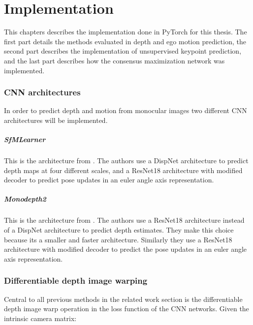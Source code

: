 \chapter{Implementation}\label{cha:implementation}

This chapters describes the implementation done in PyTorch for this thesis. The first part details the methods evaluated in depth and ego motion prediction, the second part describes the implementation of unsupervised keypoint prediction, and the last part describes how the consensus maximization network was implemented.







\iffalse

\subsection{CNN architectures}

In order to predict depth and motion from monocular images two different CNN architectures will be implemented.

\paragraph{SfMLearner} This is the architecture from \cite{sfmlearner}. The authors use a DispNet\cite{dispnet} architecture to predict depth maps at four different scales, and a ResNet18\cite{resnet} architecture with modified decoder to predict pose updates in an euler angle axis representation.

\paragraph{Monodepth2} This is the architecture from \cite{monodepth2}. The authors use a ResNet18 architecture instead of a DispNet architecture to predict depth estimates. They make this choice because its a smaller and faster architecture. Similarly they use a ResNet18 architecture with modified decoder to predict the pose updates in an euler angle axis representation.

\subsection{Differentiable depth image warping}
\label{sec:diffwarp}

Central to all previous methods in the related work section is the differentiable depth image warp operation in the loss function of the CNN networks. Given the intrinsic camera matrix:

